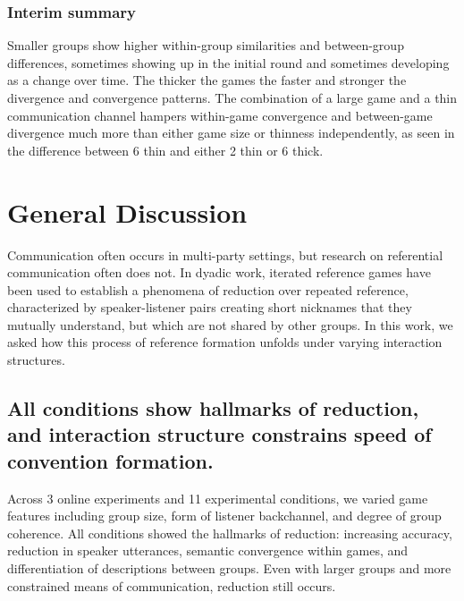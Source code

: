 \documentclass[
  english,
  a4paper,
]{article}
\begin{document}
\hypertarget{interim-summary-1}{%
\subsubsection{Interim summary}\label{interim-summary-1}}

Smaller groups show higher within-group similarities and between-group differences, sometimes showing up in the initial round and sometimes developing as a change over time. The thicker the games the faster and stronger the divergence and convergence patterns. The combination of a large game and a thin communication channel hampers within-game convergence and between-game divergence much more than either game size or thinness independently, as seen in the difference between 6 thin and either 2 thin or 6 thick.

\hypertarget{general-discussion}{%
\section{General Discussion}\label{general-discussion}}

Communication often occurs in multi-party settings, but research on referential communication often does not. In dyadic work, iterated reference games have been used to establish a phenomena of reduction over repeated reference, characterized by speaker-listener pairs creating short nicknames that they mutually understand, but which are not shared by other groups. In this work, we asked how this process of reference formation unfolds under varying interaction structures.

\hypertarget{all-conditions-show-hallmarks-of-reduction-and-interaction-structure-constrains-speed-of-convention-formation.}{%
\subsection{All conditions show hallmarks of reduction, and interaction structure constrains speed of convention formation.}\label{all-conditions-show-hallmarks-of-reduction-and-interaction-structure-constrains-speed-of-convention-formation.}}

Across 3 online experiments and 11 experimental conditions, we varied game features including group size, form of listener backchannel, and degree of group coherence. All conditions showed the hallmarks of reduction: increasing accuracy, reduction in speaker utterances, semantic convergence within games, and differentiation of descriptions between groups. Even with larger groups and more constrained means of communication, reduction still occurs.
\end{document}
